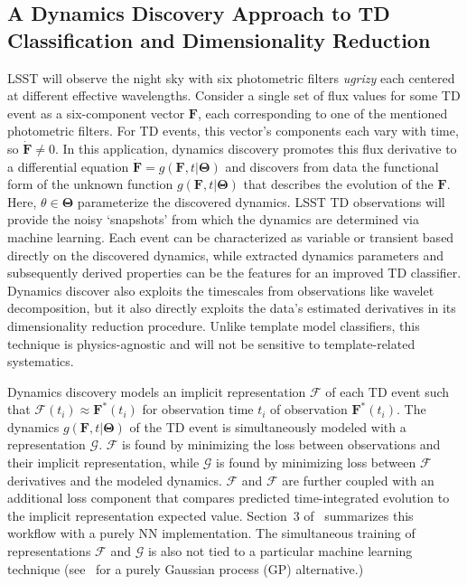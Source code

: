 \documentclass[modern]{aastex631}
\begin{document}
\subsection{A Dynamics Discovery Approach to TD Classification and Dimensionality Reduction}
LSST will observe the night sky with six photometric filters \textit{ugrizy} each centered at different effective wavelengths. 
Consider a single set of flux values for some TD event as a six-component vector $\mathbf{F}$, each corresponding to one of the mentioned photometric filters. 
For TD events, this vector's components each vary with time, so $\dot{\mathbf{F}}\neq 0$. 
In this application, dynamics discovery promotes this flux derivative to a differential equation $\dot{\mathbf{F}} = g(\mathbf{F}, t|\mathbf{\Theta})$ and discovers from data the functional form of the unknown function $g(\mathbf{F}, t|\mathbf{\Theta})$ that describes the evolution of the $\mathbf{F}$. 
Here, $\theta \in \mathbf{\Theta}$ parameterize the discovered dynamics. 
LSST TD observations will provide the noisy `snapshots' from which the dynamics are determined via machine learning. 
Each event can be characterized as variable or transient based directly on the discovered dynamics, while extracted dynamics parameters and subsequently derived properties can be the features for an improved TD classifier. 
Dynamics discover also exploits the timescales from observations like wavelet decomposition, but it also directly exploits the data's estimated derivatives in its dimensionality reduction procedure. 
Unlike template model classifiers, this technique is physics-agnostic and will not be sensitive to template-related systematics. 

Dynamics discovery models an implicit representation $\mathcal{F}$ of each TD event such that $\mathcal{F}(t_i)\approx\mathbf{F}^*(t_i)$ for observation time $t_i$ of observation $\mathbf{F}^*(t_i)$. 
The dynamics $g(\mathbf{F}, t|\mathbf{\Theta})$ of the TD event is simultaneously modeled with a representation $\mathcal{G}$. 
$\mathcal{F}$ is found by minimizing the loss between observations and their implicit representation, while $\mathcal{G}$ is found by minimizing loss between $\mathcal{F}$ derivatives and the modeled dynamics. 
$\mathcal{F}$ and $\mathcal{F}$ are further coupled with an additional loss component that compares predicted time-integrated evolution to the implicit representation expected value. 
Section~3 of~\cite{Goyal2022} summarizes this workflow with a purely NN implementation. 
The simultaneous training of representations $\mathcal{F}$ and $\mathcal{G}$ is also not tied to a particular machine learning technique (see~\cite{Raissi2018} for a purely Gaussian process (GP) alternative.)
\end{document}
